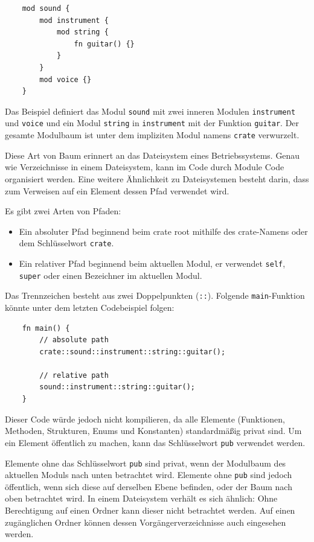 \begin{lstlisting}
    mod sound {
        mod instrument {
            mod string {
                fn guitar() {}
            }
        }
        mod voice {}
    }
\end{lstlisting}

Das Beispiel definiert das Modul \verb"sound" mit zwei inneren Modulen \verb"instrument" und \verb"voice" und ein Modul \verb"string" in \verb"instrument" mit der Funktion \verb"guitar". Der gesamte Modulbaum ist unter dem impliziten Modul namens \verb"crate" verwurzelt.

Diese Art von Baum erinnert an das Dateisystem eines Betriebssystems. Genau wie Verzeichnisse in einem Dateisystem, kann im Code durch Module Code or\-ga\-ni\-siert werden. Eine weitere Ähnlichkeit zu Dateisystemen besteht darin, dass zum Verweisen auf ein Element dessen Pfad verwendet wird.

Es gibt zwei Arten von Pfaden:

\begin{itemize}
    \item Ein absoluter Pfad beginnend beim crate root mithilfe des crate-Namens oder dem Schlüsselwort \verb"crate".
    \item Ein relativer Pfad beginnend beim aktuellen Modul, er verwendet \verb"self", \verb"super" oder einen Bezeichner im aktuellen Modul.
\end{itemize}

Das Trennzeichen besteht aus zwei Doppelpunkten (\verb"::"). Folgende \verb"main"-Funktion könnte unter dem letzten Codebeispiel folgen:

\begin{lstlisting}
    fn main() {
        // absolute path
        crate::sound::instrument::string::guitar();

        // relative path
        sound::instrument::string::guitar();
    }
\end{lstlisting}

Dieser Code würde jedoch nicht kompilieren, da alle Elemente (Funktionen, Methoden, Strukturen, Enums und Konstanten) standardmäßig privat sind. Um ein Element öffentlich zu machen, kann das Schlüsselwort \verb"pub" verwendet werden.

Elemente ohne das Schlüsselwort \verb"pub" sind privat, wenn der Modulbaum des aktuellen Moduls \glqq nach unten\grqq{} betrachtet wird. Elemente ohne \verb"pub" sind jedoch öffentlich, wenn sich diese auf derselben Ebene befinden, oder der Baum \glqq nach oben\grqq{} betrachtet wird. In einem Dateisystem verhält es sich ähnlich: Ohne Berechtigung auf einen Ordner kann dieser nicht betrachtet werden. Auf einen zugänglichen Ordner können dessen Vorgängerverzeichnisse auch eingesehen werden.


